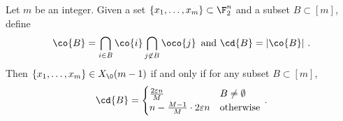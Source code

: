 \begin{lemma}\label{lem:face-decomposition}
Let $m$ be an integer. 
Given a set $\{x_1,\dots,x_m\} \subset \F_2^n$ and a subset $B \subset [m]$, define 
\[\co{B} =\bigcap_{i\in B} \co{i} \bigcap_{j\not\in B} \oco{j}\, \text{ and }\cd{B} = |\co{B}| ~.\]
Then $\{x_1,\dots,x_m\}\in X_\0(m-1)$  if and only if for any subset $B \subset [m]$,
\[ \cd{B} = \begin{cases}\frac{2\varepsilon n}{M} ~~~&B \neq \emptyset \\
 n - \frac{M-1}{M}\cdot2\varepsilon n&\text{otherwise}\end{cases}\, .\]
\end{lemma}
